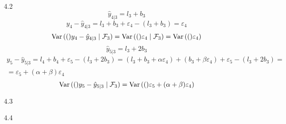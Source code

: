 \protect \hypertarget {soln:4.2}{}
\begin{solution}{{4.2}}
\[
\hat y_{4|3} = l_3 + b_3
\]
\[
y_4 - \hat y_{4|3} = l_3 + b_3 + \varepsilon_4 - (l_3 + b_3) = \varepsilon_4
\]
\[
\operatorname{Var}{\left((\right)}y_4 - \hat y_{4|3} \mid \mathcal{F}_3) = \operatorname{Var}{\left((\right)}\varepsilon_4 \mid \mathcal{F}_3) = \operatorname{Var}{\left((\right)}\varepsilon_4)
\]
\[
\hat y_{5|3} = l_3 + 2b_3
\]
\begin{multline}
y_5 - \hat y_{5|3} = l_4 + b_4 + \varepsilon_5 - (l_3 + 2b_3) = (l_3 + b_3 + \alpha \varepsilon_4)  +
(b_3 + \beta \varepsilon_4) + \varepsilon_5 - (l_3 + 2b_3) = \\
= \varepsilon_5 + (\alpha + \beta) \varepsilon_4
\end{multline}
\[
\operatorname{Var}{\left((\right)}y_5 - \hat y_{5|3} \mid \mathcal{F}_3) = \operatorname{Var}{\left((\right)}\varepsilon_5 + (\alpha + \beta) \varepsilon_4 )
\]
\end{solution}
\protect \hypertarget {soln:4.3}{}
\begin{solution}{{4.3}}
\end{solution}
\protect \hypertarget {soln:4.4}{}
\begin{solution}{{4.4}}
\end{solution}
\protect \hypertarget {soln:4.5}{}
